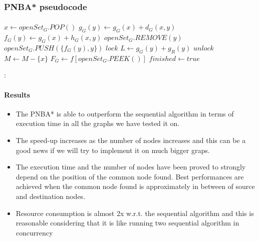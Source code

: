 \documentclass[12pt]{beamer}
\begin{document}
	\subsubsection{PNBA* pseudocode}
	\begin{frame}[allowframebreaks]{\secname}
		\framesubtitle{\subsecname}
		\begin{algorithmic}[1]
					\State $x \gets openSet_G.POP()$\; 
										\State $g_G(y) \gets g_G(x) + d_G(x, y)$
										\State $f_G(y) \gets g_G(x) + h_G(x, y)$
											\State $openSet_G.REMOVE(y)$
										\EndIf
										\State $openSet_G.PUSH(\{f_G(y), y\})$
											\State $lock$\;
												\State $L \gets g_G(y) + g_R(y)$\;
											\EndIf
											\State $unlock$\;
										\EndIf
									\EndIf
								\EndFor
							\EndIf
							\State $ M \gets M - \{x\}$\;
					\EndIf
						\State $F_G \gets f[openSet_G.PEEK()]$\;
						\Else
						 	\State $finished \gets true$\;
					\EndIf
				\EndWhile
			\EndFunction
		  \end{algorithmic}
	\end{frame}
	\begin{frame}{\secname : \subsecname}
		\framesubtitle{Results}
		\begin{itemize}
			\item The PNBA* is able to outperform the sequential algorithm in terms of execution time in all the 
				  graphs we have tested it on.
			\item The speed-up increases as the number of nodes increases and this can 
				  be a good news if we will try to implement it on much bigger graps.
			\item The execution time and the number of
				  nodes have been proved to strongly depend on the position of the common node found. Best performances
				  are achieved when the common node found is approximately in between of source and destination nodes.
			\item Resource consumption is almost 2x w.r.t. the sequential algorithm and this is reasonable considering
				  that it is like running two sequential algorithm in concurrency
		\end{itemize}
	\end{frame}
\end{document}
